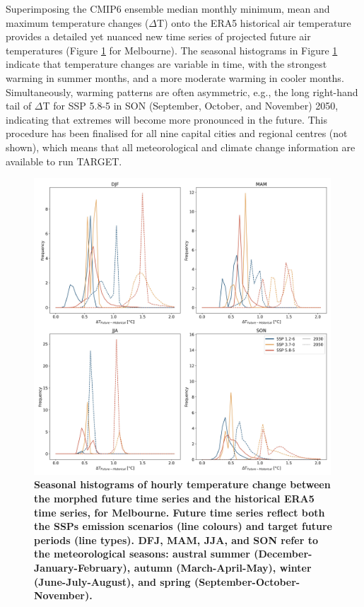 \documentclass[utf8]{frontiersSCNS} %
\begin{document}
Superimposing the CMIP6 ensemble median monthly minimum, mean and maximum temperature changes ($\Delta$T) onto the ERA5 historical air temperature provides a detailed yet nuanced new time series of projected future air temperatures (Figure \ref{fig:MelHist} for Melbourne). The seasonal histograms in Figure \ref{fig:MelHist} indicate that temperature changes are variable in time, with the strongest warming in summer months, and a more moderate warming in cooler months. Simultaneously, warming patterns are often asymmetric, e.g., the long right-hand tail of $\Delta$T for SSP 5.8-5 in SON (September, October, and November) 2050, indicating that extremes will become more pronounced in the future. This procedure has been finalised for all nine capital cities and regional centres (not shown), which means that all meteorological and climate change information are available to run TARGET.


\begin{figure}[h]
\centering
\includegraphics[width=0.99\textwidth]{images/image3.jpg}
\caption{\bf Seasonal histograms of hourly temperature change between the morphed future time series and the historical ERA5 time series, for Melbourne. Future time series reflect both the SSPs emission scenarios (line colours) and target future periods (line types). DFJ, MAM, JJA, and SON refer to the meteorological seasons: austral summer (December-January-February), autumn (March-April-May), winter (June-July-August), and spring (September-October-November).}
 \label{fig:MelHist}
\end{figure}
\end{document}
